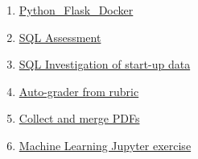 \documentclass[12pt]{resume}
\begin{document}
{\begin{multicols}{2}
\begin{enumerate}
\item \href{https://github.com/JonathanDoanePhD/Python_Flask_Docker}{%
Python\_Flask\_Docker}
\item \href{https://github.com/JonathanDoanePhD/SQL_Assessment}{%
SQL Assessment}
\item \href{https://github.com/JonathanDoanePhD/SQL_Investigation_of_startup_company_data}{%
SQL Investigation of start-up data}
\item \href{https://github.com/JonathanDoanePhD/Auto_Grader_from_Rubric}{%
Auto-grader from rubric}
\item \href{https://github.com/JonathanDoanePhD/Collect_PDFs_from_eMATHinstruction}{%
Collect and merge PDFs}
\item
\href{https://github.com/JonathanDoanePhD/Machine_Learning_Exercise_for_Self-Practice_PYTHON_JUPYTER/tree/main}{%
Machine Learning Jupyter exercise}
\end{enumerate}
\end{multicols}


















}
\end{document}
